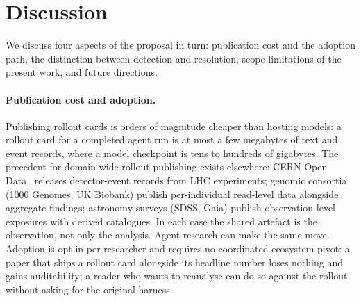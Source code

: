 \documentclass{article}
\begin{document}
\section{Discussion}
\label{sec:discussion}

We discuss four aspects of the proposal in turn: publication
cost and the adoption path, the distinction between detection
and resolution, scope limitations of the present work, and
future directions.

\paragraph{Publication cost and adoption.} Publishing rollout
cards is orders of magnitude cheaper than hosting models: a
rollout card for a completed agent run is at most a few
megabytes of text and event records, where a model checkpoint
is tens to hundreds of gigabytes. The precedent for domain-wide
rollout publishing exists elsewhere: CERN Open
Data~\citep{cernopendata} releases detector-event records from
LHC experiments; genomic consortia (1000 Genomes, UK Biobank)
publish per-individual read-level data alongside aggregate
findings; astronomy surveys (SDSS, Gaia) publish
observation-level exposures with derived catalogues. In each
case the shared artefact is the observation, not only the
analysis. Agent research can make the same move. Adoption is
opt-in per researcher and requires no coordinated ecosystem
pivot: a paper that ships a rollout card alongside its headline
number loses nothing and gains auditability; a reader who wants
to reanalyse can do so against the rollout without asking for
the original harness.
\end{document}
